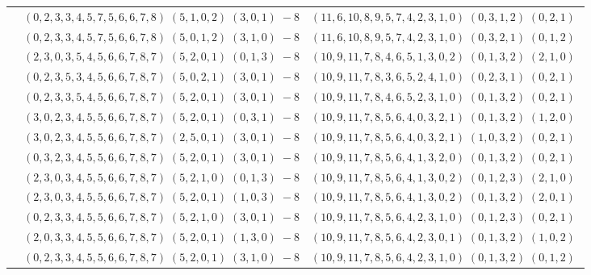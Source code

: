 \documentclass[11pt]{article}
\begin{document}
\begin{longtable}[l]{|c|c|c|}
 \cline{2-3} 
 & $(0 ,2 ,3 ,3 ,4 ,5 ,7 ,5 ,6 ,6 ,7 ,8) \;(5 ,1 ,0 ,2) \;(3 ,0 ,1) \;-8$ & $(11 ,6 ,10 ,8 ,9 ,5 ,7 ,4 ,2 ,3 ,1 ,0) \;(0 ,3 ,1 ,2) \;(0 ,2 ,1) \;$\\ 
 \cline{2-3} 
 & $(0 ,2 ,3 ,3 ,4 ,5 ,7 ,5 ,6 ,6 ,7 ,8) \;(5 ,0 ,1 ,2) \;(3 ,1 ,0) \;-8$ & $(11 ,6 ,10 ,8 ,9 ,5 ,7 ,4 ,2 ,3 ,1 ,0) \;(0 ,3 ,2 ,1) \;(0 ,1 ,2) \;$\\ 
 \cline{2-3} 
 & $(2 ,3 ,0 ,3 ,5 ,4 ,5 ,6 ,6 ,7 ,8 ,7) \;(5 ,2 ,0 ,1) \;(0 ,1 ,3) \;-8$ & $(10 ,9 ,11 ,7 ,8 ,4 ,6 ,5 ,1 ,3 ,0 ,2) \;(0 ,1 ,3 ,2) \;(2 ,1 ,0) \;$\\ 
 \cline{2-3} 
 & $(0 ,2 ,3 ,5 ,3 ,4 ,5 ,6 ,6 ,7 ,8 ,7) \;(5 ,0 ,2 ,1) \;(3 ,0 ,1) \;-8$ & $(10 ,9 ,11 ,7 ,8 ,3 ,6 ,5 ,2 ,4 ,1 ,0) \;(0 ,2 ,3 ,1) \;(0 ,2 ,1) \;$\\ 
 \cline{2-3} 
 & $(0 ,2 ,3 ,3 ,5 ,4 ,5 ,6 ,6 ,7 ,8 ,7) \;(5 ,2 ,0 ,1) \;(3 ,0 ,1) \;-8$ & $(10 ,9 ,11 ,7 ,8 ,4 ,6 ,5 ,2 ,3 ,1 ,0) \;(0 ,1 ,3 ,2) \;(0 ,2 ,1) \;$\\ 
 \cline{2-3} 
 & $(3 ,0 ,2 ,3 ,4 ,5 ,5 ,6 ,6 ,7 ,8 ,7) \;(5 ,2 ,0 ,1) \;(0 ,3 ,1) \;-8$ & $(10 ,9 ,11 ,7 ,8 ,5 ,6 ,4 ,0 ,3 ,2 ,1) \;(0 ,1 ,3 ,2) \;(1 ,2 ,0) \;$\\ 
 \cline{2-3} 
 & $(3 ,0 ,2 ,3 ,4 ,5 ,5 ,6 ,6 ,7 ,8 ,7) \;(2 ,5 ,0 ,1) \;(3 ,0 ,1) \;-8$ & $(10 ,9 ,11 ,7 ,8 ,5 ,6 ,4 ,0 ,3 ,2 ,1) \;(1 ,0 ,3 ,2) \;(0 ,2 ,1) \;$\\ 
 \cline{2-3} 
 & $(0 ,3 ,2 ,3 ,4 ,5 ,5 ,6 ,6 ,7 ,8 ,7) \;(5 ,2 ,0 ,1) \;(3 ,0 ,1) \;-8$ & $(10 ,9 ,11 ,7 ,8 ,5 ,6 ,4 ,1 ,3 ,2 ,0) \;(0 ,1 ,3 ,2) \;(0 ,2 ,1) \;$\\ 
 \cline{2-3} 
 & $(2 ,3 ,0 ,3 ,4 ,5 ,5 ,6 ,6 ,7 ,8 ,7) \;(5 ,2 ,1 ,0) \;(0 ,1 ,3) \;-8$ & $(10 ,9 ,11 ,7 ,8 ,5 ,6 ,4 ,1 ,3 ,0 ,2) \;(0 ,1 ,2 ,3) \;(2 ,1 ,0) \;$\\ 
 \cline{2-3} 
 & $(2 ,3 ,0 ,3 ,4 ,5 ,5 ,6 ,6 ,7 ,8 ,7) \;(5 ,2 ,0 ,1) \;(1 ,0 ,3) \;-8$ & $(10 ,9 ,11 ,7 ,8 ,5 ,6 ,4 ,1 ,3 ,0 ,2) \;(0 ,1 ,3 ,2) \;(2 ,0 ,1) \;$\\ 
 \cline{2-3} 
 & $(0 ,2 ,3 ,3 ,4 ,5 ,5 ,6 ,6 ,7 ,8 ,7) \;(5 ,2 ,1 ,0) \;(3 ,0 ,1) \;-8$ & $(10 ,9 ,11 ,7 ,8 ,5 ,6 ,4 ,2 ,3 ,1 ,0) \;(0 ,1 ,2 ,3) \;(0 ,2 ,1) \;$\\ 
 \cline{2-3} 
 & $(2 ,0 ,3 ,3 ,4 ,5 ,5 ,6 ,6 ,7 ,8 ,7) \;(5 ,2 ,0 ,1) \;(1 ,3 ,0) \;-8$ & $(10 ,9 ,11 ,7 ,8 ,5 ,6 ,4 ,2 ,3 ,0 ,1) \;(0 ,1 ,3 ,2) \;(1 ,0 ,2) \;$\\ 
 \cline{2-3} 
 & $(0 ,2 ,3 ,3 ,4 ,5 ,5 ,6 ,6 ,7 ,8 ,7) \;(5 ,2 ,0 ,1) \;(3 ,1 ,0) \;-8$ & $(10 ,9 ,11 ,7 ,8 ,5 ,6 ,4 ,2 ,3 ,1 ,0) \;(0 ,1 ,3 ,2) \;(0 ,1 ,2) \;$\\ 

\end{longtable}
\end{document}

